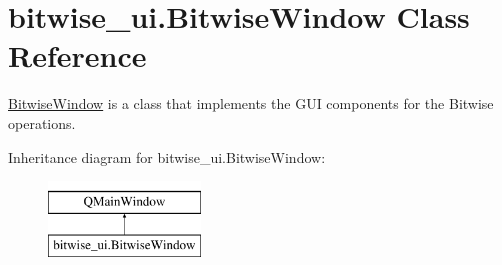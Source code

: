 \hypertarget{classbitwise__ui_1_1_bitwise_window}{}\section{bitwise\+\_\+ui.\+Bitwise\+Window Class Reference}
\label{classbitwise__ui_1_1_bitwise_window}


\hyperlink{classbitwise__ui_1_1_bitwise_window}{Bitwise\+Window} is a class that implements the G\+UI components for the Bitwise operations.  


Inheritance diagram for bitwise\+\_\+ui.\+Bitwise\+Window\+:\begin{figure}[H]
\begin{center}
\leavevmode
\includegraphics[height=2.000000cm]{classbitwise__ui_1_1_bitwise_window}
\end{center}
\end{figure}
